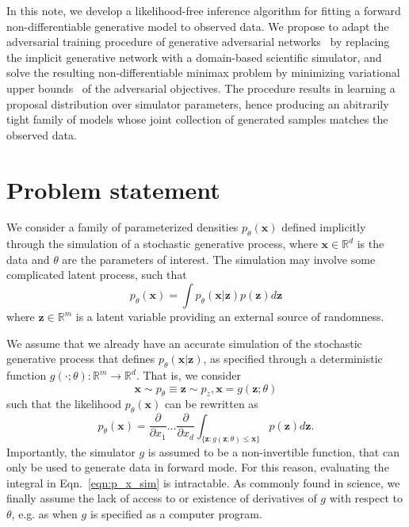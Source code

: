 \documentclass[twocolumn,superscriptaddress,aps]{revtex4-1}
\theoremstyle{plain}
\begin{document}
In this note, we develop a likelihood-free inference algorithm for fitting a
forward non-differentiable generative model to observed data. We propose to
adapt the adversarial training procedure of generative adversarial
networks~\cite{goodfellow2014generative} by replacing the implicit generative
network with a domain-based scientific simulator, and solve the resulting
non-differentiable minimax problem by minimizing variational upper bounds~\citep{2011arXiv1106.4487W,2012arXiv1212.4507S} of the
adversarial objectives. The procedure results in learning a proposal distribution over
simulator parameters, hence producing an abitrarily tight family of models whose
joint collection of generated samples matches the observed data.



\section{Problem statement}
\label{sec:problem}

We consider a family of parameterized densities $p_\theta(\mathbf{x})$
defined implicitly through the simulation of a stochastic generative process,
where $\mathbf{x} \in \mathbb{R}^d$ is the data and $\theta$ are the
parameters of interest. The simulation may involve some complicated latent
process, such that
\begin{equation}\label{eqn:p_x}
    p_\theta(\mathbf{x}) = \int p_\theta(\mathbf{x}|\mathbf{z}) p(\mathbf{z}) d\mathbf{z}
\end{equation}
where $\mathbf{z} \in \mathbb{R}^m$ is a latent variable providing an external source
of randomness.

We assume that we already have an accurate simulation of the stochastic
generative process that defines $p_\theta(\mathbf{x}|\mathbf{z})$, as
specified through a deterministic function $g(\cdot; \theta) : \mathbb{R}^m \to
\mathbb{R}^d$. That is, we consider
\begin{equation}\label{eqn:p_theta}
    \mathbf{x} \sim p_\theta \equiv \mathbf{z} \sim p_z, \mathbf{x} = g(\mathbf{z}; \theta)
\end{equation}
such that the likelihood $p_\theta(\mathbf{x})$ can be rewritten as
\begin{equation}\label{eqn:p_x_sim}
    p_\theta(\mathbf{x}) = \frac{\partial}{\partial x_1} \dots \frac{\partial}{\partial x_d} \int_{\{\mathbf{z}:g(\mathbf{z};\theta) \leq \mathbf{x}\}} p(\mathbf{z}) d\mathbf{z}.
\end{equation}
Importantly, the simulator $g$ is assumed to be a non-invertible function, that can only be
used to generate data in forward mode. For this reason, evaluating the integral
in Eqn.~\ref{eqn:p_x_sim} is intractable. As commonly found
in science, we finally assume the lack of access to or existence of derivatives of $g$ with respect to $\theta$,
e.g. as when $g$ is specified as a computer program.
\end{document}
